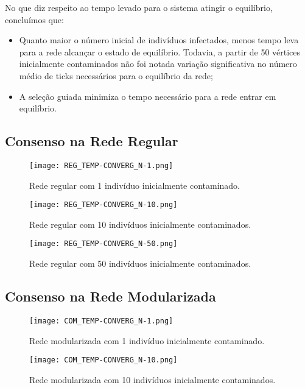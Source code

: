 \documentclass{article}
\begin{document}
No que diz respeito ao tempo levado para o sistema atingir o equilíbrio, concluímos que:

\begin{itemize}
	\item Quanto maior o número inicial de indivíduos infectados, menos tempo 		leva para a rede alcançar o estado de equilíbrio. Todavia, a partir de 50 		vértices inicialmente contaminados não foi notada variação significativa no 		número médio de ticks necessários para o equilíbrio da rede;
	\item A seleção guiada minimiza o tempo necessário para a rede entrar em 			equilíbrio.
\end{itemize}

\subsection{Consenso na Rede Regular}

\begin{figure}[H]
  \centerline{\texttt{[image: REG\_TEMP-CONVERG\_N-1.png]}}
  \caption{Rede regular com 1 indivíduo inicialmente contaminado.}
  \label{fig:boat1}
\end{figure}

\begin{figure}[H]
  \centerline{\texttt{[image: REG\_TEMP-CONVERG\_N-10.png]}}
  \caption{Rede regular com 10 indivíduos inicialmente contaminados.}
  \label{fig:boat1}
\end{figure}

\begin{figure}[H]
  \centerline{\texttt{[image: REG\_TEMP-CONVERG\_N-50.png]}}
  \caption{Rede regular com 50 indivíduos inicialmente contaminados.}
  \label{fig:boat1}
\end{figure}

\subsection{Consenso na Rede Modularizada}

\begin{figure}[H]
  \centerline{\texttt{[image: COM\_TEMP-CONVERG\_N-1.png]}}
  \caption{Rede modularizada com 1 indivíduo inicialmente contaminado.}
  \label{fig:boat1}
\end{figure}

\begin{figure}[H]
  \centerline{\texttt{[image: COM\_TEMP-CONVERG\_N-10.png]}}
  \caption{Rede modularizada com 10 indivíduos inicialmente contaminados.}
  \label{fig:boat1}
\end{figure}
\end{document}
